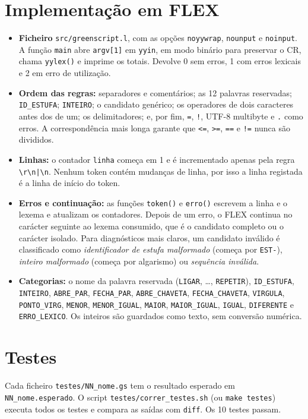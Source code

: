 \documentclass[10pt,a4paper]{article}
\newcommand{\tk}[1]{\texttt{#1}}
\begin{document}
\section{Implementação em FLEX}
\begin{itemize}
\item \textbf{Ficheiro} \tk{src/greenscript.l}, com as opções \tk{noyywrap}, \tk{nounput} e \tk{noinput}. A função \tk{main} abre
\tk{argv[1]} em \tk{yyin}, em modo binário para preservar o CR, chama \tk{yylex()} e imprime os totais. Devolve 0 sem
erros, 1 com erros lexicais e 2 em erro de utilização.
\item \textbf{Ordem das regras:} separadores e comentários; as 12 palavras reservadas; \tk{ID\_ESTUFA}; \tk{INTEIRO}; o
candidato genérico; os operadores de dois caracteres antes dos de um; os delimitadores; e, por fim, \tk{=}, \tk{!},
UTF-8 multibyte e \tk{.} como erros. A correspondência mais longa garante que \tk{<=}, \tk{>=}, \tk{==} e \tk{!=} nunca
são divididos.
\item \textbf{Linhas:} o contador \tk{linha} começa em 1 e é incrementado apenas pela regra \tk{\textbackslash r\textbackslash n|\textbackslash n}.
Nenhum token contém mudanças de linha, por isso a linha registada é a linha de início do token.
\item \textbf{Erros e continuação:} as funções \tk{token()} e \tk{erro()} escrevem a linha e o lexema e atualizam os contadores.
Depois de um erro, o FLEX continua no carácter seguinte ao lexema consumido, que é o candidato completo ou o carácter
isolado. Para diagnósticos mais claros, um candidato inválido é classificado como
\emph{identificador de estufa malformado} (começa por \tk{EST-}), \emph{inteiro malformado} (começa por algarismo)
ou \emph{sequência inválida}.
\item \textbf{Categorias:} o nome da palavra reservada (\tk{LIGAR}, \dots, \tk{REPETIR}), \tk{ID\_ESTUFA}, \tk{INTEIRO},
\tk{ABRE\_PAR}, \tk{FECHA\_PAR}, \tk{ABRE\_CHAVETA}, \tk{FECHA\_CHAVETA}, \tk{VIRGULA}, \tk{PONTO\_VIRG}, \tk{MENOR},
\tk{MENOR\_IGUAL}, \tk{MAIOR}, \tk{MAIOR\_IGUAL}, \tk{IGUAL}, \tk{DIFERENTE} e \tk{ERRO\_LEXICO}. Os inteiros são
guardados como texto, sem conversão numérica.
\end{itemize}

\section{Testes}
\sloppy Cada ficheiro \tk{testes/NN\_nome.gs} tem o resultado esperado em \tk{NN\_nome.esperado}. O script
\tk{testes/correr\_testes.sh} (ou \tk{make testes}) executa todos os testes e compara as saídas com \tk{diff}.
Os 10 testes passam.
\end{document}
